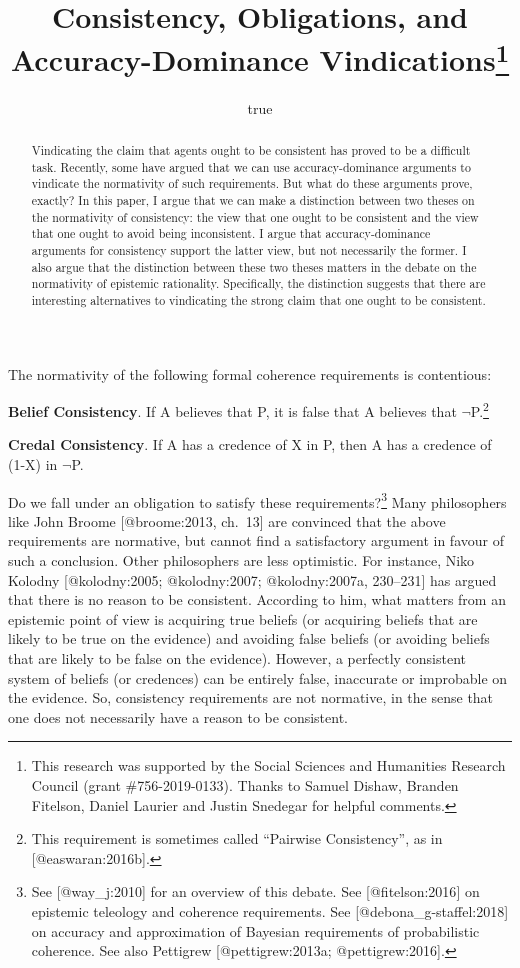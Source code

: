 \documentclass[
]{article}
\title{Consistency, Obligations, and Accuracy-Dominance
Vindications\thanks{This research was supported by the Social Sciences
and Humanities Research Council (grant \#756-2019-0133). Thanks to
Samuel Dishaw, Branden Fitelson, Daniel Laurier and Justin Snedegar for
helpful comments.}}
\author{true}
\date{}
\begin{document}
\maketitle
\begin{abstract}
Vindicating the claim that agents ought to be consistent has proved to
be a difficult task. Recently, some have argued that we can use
accuracy-dominance arguments to vindicate the normativity of such
requirements. But what do these arguments prove, exactly? In this paper,
I argue that we can make a distinction between two theses on the
normativity of consistency: the view that one ought to be consistent and
the view that one ought to avoid being inconsistent. I argue that
accuracy-dominance arguments for consistency support the latter view,
but not necessarily the former. I also argue that the distinction
between these two theses matters in the debate on the normativity of
epistemic rationality. Specifically, the distinction suggests that there
are interesting alternatives to vindicating the strong claim that one
ought to be consistent.
\end{abstract}

The normativity of the following formal coherence requirements is
contentious:

\textbf{Belief Consistency}. If A believes that P, it is false that A
believes that \(\neg\)P.\footnote{This requirement is sometimes called
  ``Pairwise Consistency'', as in {[}@easwaran:2016b{]}.}

\textbf{Credal Consistency}. If A has a credence of X in P, then A has a
credence of (1-X) in \(\neg\)P.

\noindent Do we fall under an obligation to satisfy these
requirements?\footnote{See {[}@way\_j:2010{]} for an overview of this
  debate. See {[}@fitelson:2016{]} on epistemic teleology and coherence
  requirements. See {[}@debona\_g-staffel:2018{]} on accuracy and
  approximation of Bayesian requirements of probabilistic coherence. See
  also Pettigrew {[}@pettigrew:2013a; @pettigrew:2016{]}.} Many
philosophers like John Broome {[}@broome:2013, ch.~13{]} are convinced
that the above requirements are normative, but cannot find a
satisfactory argument in favour of such a conclusion. Other philosophers
are less optimistic. For instance, Niko Kolodny {[}@kolodny:2005;
@kolodny:2007; @kolodny:2007a, 230--231{]} has argued that there is no
reason to be consistent. According to him, what matters from an
epistemic point of view is acquiring true beliefs (or acquiring beliefs
that are likely to be true on the evidence) and avoiding false beliefs
(or avoiding beliefs that are likely to be false on the evidence).
However, a perfectly consistent system of beliefs (or credences) can be
entirely false, inaccurate or improbable on the evidence. So,
consistency requirements are not normative, in the sense that one does
not necessarily have a reason to be consistent.
\end{document}
